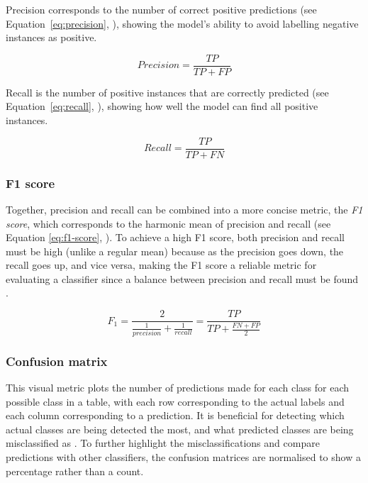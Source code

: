 Precision corresponds to the number of correct positive predictions (see Equation~\ref{eq:precision}, \cite{Liu2009}), showing the model's ability to avoid labelling negative instances as positive. 

\begin{equation}
\label{eq:precision}
    Precision = \frac{TP}{TP+FP}
\end{equation}

Recall is the number of positive instances that are correctly predicted (see Equation~\ref{eq:recall}, \cite{Liu2009}), showing how well the model can find all positive instances.

\begin{equation}
\label{eq:recall}
    Recall = \frac{TP}{TP+FN}
\end{equation}

\subsubsection{F1 score}

Together, precision and recall can be combined into a more concise metric, the \textit{F1 score}, which corresponds to the harmonic mean of precision and recall (see Equation \ref{eq:f1-score}, \cite{Geron2019}). To achieve a high F1 score, both precision and recall must be high (unlike a regular mean) because as the precision goes down, the recall goes up, and vice versa, making the F1 score a reliable metric for evaluating a classifier since a balance between precision and recall must be found \citep{Geron2019}.

\begin{equation}
\label{eq:f1-score}
    F_{1} = \frac{2}{\frac{1}{precision} + \frac{1}{recall}} = \frac{TP}{TP+\frac{FN + FP}{2}}
\end{equation}

\subsubsection{Confusion matrix} 

This visual metric plots the number of predictions made for each class for each possible class in a table, with each row corresponding to the actual labels and each column corresponding to a prediction. It is beneficial for detecting which actual classes are being detected the most, and what predicted classes are being misclassified as \citep{Bhardwaj2015, Liu2009}. To further highlight the misclassifications and compare predictions with other classifiers, the confusion matrices are normalised to show a percentage rather than a count.

